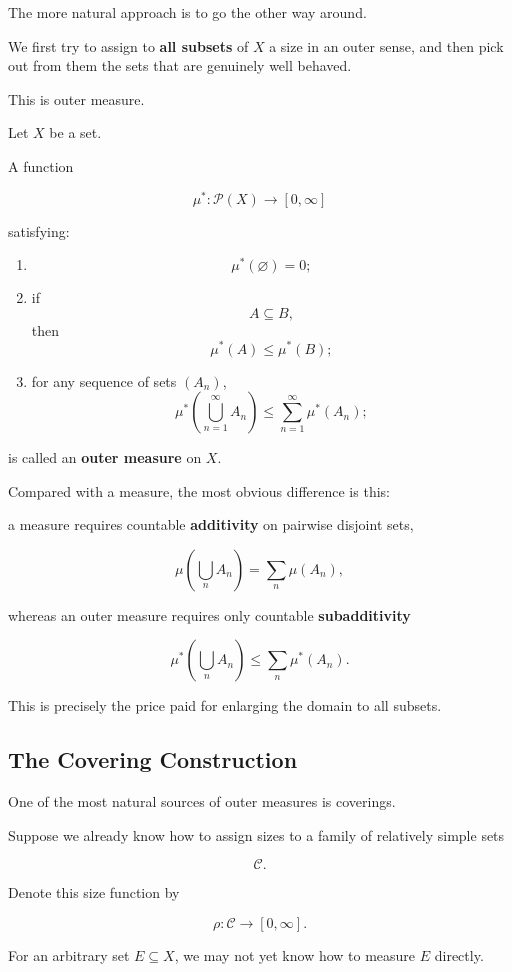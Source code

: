 \documentclass[11pt]{article}
\begin{document}
The more natural approach is to go the other way around.

We first try to assign to \textbf{all subsets} of $X$ a size in an outer sense, and then pick out from them the sets that are genuinely well behaved.

This is outer measure.

Let $X$ be a set.

A function

\[
\mu^{*}:\mathcal{P}(X)\rightarrow[0,\infty]
\]

satisfying:

\begin{enumerate}
  \item \[
  \mu^{*}(\varnothing)=0;
  \]
  \item if
  \[
  A\subseteq B,
  \]
  then
  \[
  \mu^{*}(A)\leq\mu^{*}(B);
  \]
  \item for any sequence of sets $(A_{n})$,
  \[
  \mu^{*}\left(\bigcup_{n=1}^{\infty}A_{n}\right)\leq\sum_{n=1}^{\infty}\mu^{*}(A_{n});
  \]
\end{enumerate}

is called an \textbf{outer measure} on $X$.

Compared with a measure, the most obvious difference is this:

a measure requires countable \textbf{additivity} on pairwise disjoint sets,

\[
\mu\left(\bigcup_{n}A_{n}\right)=\sum_{n}\mu(A_{n}),
\]

whereas an outer measure requires only countable \textbf{subadditivity}

\[
\mu^{*}\left(\bigcup_{n}A_{n}\right)\leq\sum_{n}\mu^{*}(A_{n}).
\]

This is precisely the price paid for enlarging the domain to all subsets.

\subsection{The Covering Construction}

One of the most natural sources of outer measures is coverings.

Suppose we already know how to assign sizes to a family of relatively simple sets

\[
\mathcal{C}.
\]

Denote this size function by

\[
\rho:\mathcal{C}\rightarrow[0,\infty].
\]

For an arbitrary set $E\subseteq X$, we may not yet know how to measure $E$ directly.
\end{document}
